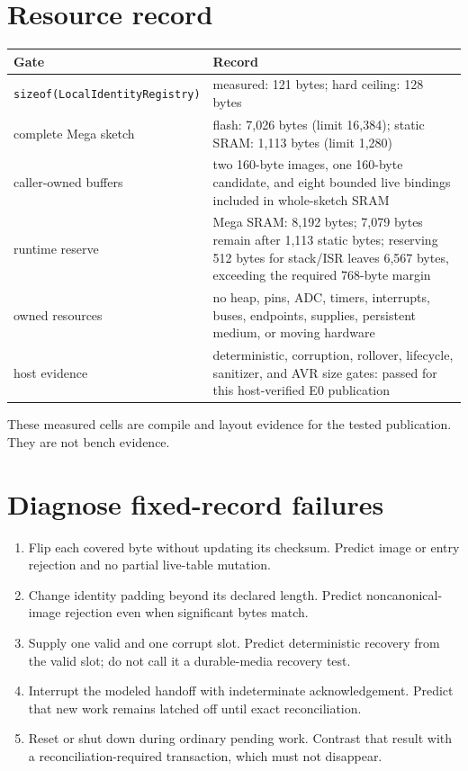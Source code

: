 \documentclass[11pt]{article}
\begin{document}
\section{Resource record}
\begin{tabularx}{\linewidth}{@{}l X@{}}
\toprule
Gate & Record\\
\midrule
\texttt{sizeof(LocalIdentityRegistry)} & measured: 121 bytes;
hard ceiling: 128 bytes\\[6pt]
complete Mega sketch & flash: 7,026 bytes (limit 16,384);
static SRAM: 1,113 bytes (limit 1,280)\\[6pt]
caller-owned buffers & two 160-byte images, one 160-byte candidate, and eight
bounded live bindings included in whole-sketch SRAM\\[6pt]
runtime reserve & Mega SRAM: 8,192 bytes; 7,079 bytes remain after 1,113
static bytes; reserving 512 bytes for stack/ISR leaves 6,567 bytes, exceeding
the required 768-byte margin\\[6pt]
owned resources & no heap, pins, ADC, timers, interrupts, buses, endpoints,
supplies, persistent medium, or moving hardware\\[6pt]
host evidence & deterministic, corruption, rollover, lifecycle, sanitizer,
and AVR size gates: passed for this host-verified E0 publication\\
\bottomrule
\end{tabularx}

These measured cells are compile and layout evidence for the tested
publication. They are not bench evidence.

\section{Diagnose fixed-record failures}
\begin{enumerate}
 \item Flip each covered byte without updating its checksum. Predict image or
       entry rejection and no partial live-table mutation.
 \item Change identity padding beyond its declared length. Predict
       noncanonical-image rejection even when significant bytes match.
 \item Supply one valid and one corrupt slot. Predict deterministic recovery
       from the valid slot; do not call it a durable-media recovery test.
 \item Interrupt the modeled handoff with indeterminate acknowledgement.
       Predict that new work remains latched off until exact reconciliation.
 \item Reset or shut down during ordinary pending work. Contrast that result
       with a reconciliation-required transaction, which must not disappear.
\end{enumerate}
\end{document}
